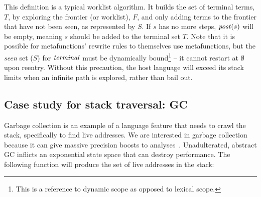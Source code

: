 This definition is a typical worklist algorithm.
%
It builds the set of terminal terms, $T$, by exploring the frontier (or worklist), $F$, and only adding terms to the frontier that have not been seen, as represented by $S$.
%
If $s$ has no more steps, $\mathit{post}(s)$ will be empty, meaning $s$ should be added to the terminal set $T$.%
%
Note that it is possible for metafunctions' rewrite rules to themselves use metafunctions, but the \emph{seen} set ($S$) for $\mathit{terminal}$ must be dynamically bound\footnote{This is a reference to dynamic scope as opposed to lexical scope.} -- it cannot restart at $\emptyset$ upon reentry.
%
Without this precaution, the host language will exceed its stack limits when an infinite path is explored, rather than bail out.

\subsection{Case study for stack traversal: GC}\label{sec:gc}
Garbage collection is an example of a language feature that needs to crawl the stack, specifically to find live addresses.
%
We are interested in garbage collection because it can give massive precision boosts to analyses~\citep{dvanhorn:Might:2006:GammaCFA,dvanhorn:Earl2012Introspective}.
%
Unadulterated, abstract GC inflicts an exponential state space that can destroy performance.
%
The following function will produce the set of live addresses in the stack:


